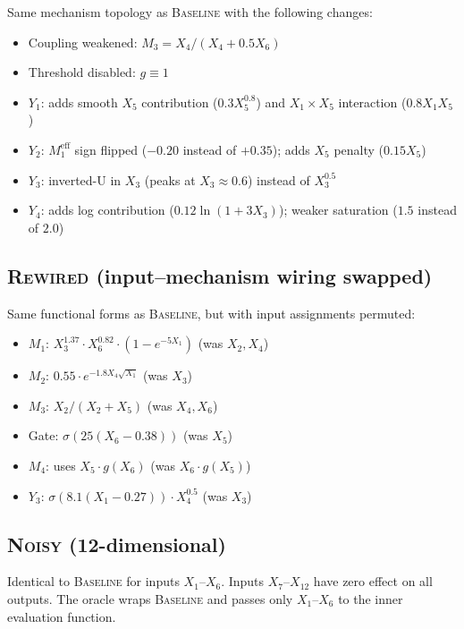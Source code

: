 \documentclass[11pt,letterpaper]{article}
\newcommand{\oracle}[1]{\textsc{#1}}
\newcommand{\baseline}{\oracle{Baseline}}
\newcommand{\rewired}{\oracle{Rewired}}
\newcommand{\noisy}{\oracle{Noisy}}
\begin{document}
Same mechanism topology as \baseline{} with the following changes:
\begin{itemize}
  \item Coupling weakened: $M_3 = X_4 / (X_4 + 0.5 X_6)$
  \item Threshold disabled: $g \equiv 1$
  \item $Y_1$: adds smooth $X_5$ contribution ($0.3 X_5^{0.8}$) and
    $X_1 \times X_5$ interaction ($0.8 X_1 X_5$)
  \item $Y_2$: $M_1^{\text{eff}}$ sign flipped ($-0.20$ instead of
    $+0.35$); adds $X_5$ penalty ($0.15 X_5$)
  \item $Y_3$: inverted-U in $X_3$ (peaks at $X_3 \approx 0.6$)
    instead of $X_3^{0.5}$
  \item $Y_4$: adds log contribution ($0.12 \ln(1 + 3X_3)$); weaker
    saturation ($1.5$ instead of $2.0$)
\end{itemize}

\subsection{\rewired{} (input--mechanism wiring swapped)}

Same functional forms as \baseline{}, but with input assignments
permuted:
\begin{itemize}
  \item $M_1$: $X_3^{1.37} \cdot X_6^{0.82} \cdot (1 - e^{-5X_1})$
    \quad (was $X_2, X_4$)
  \item $M_2$: $0.55 \cdot e^{-1.8 X_4 \sqrt{X_1}}$
    \quad (was $X_3$)
  \item $M_3$: $X_2 / (X_2 + X_5)$
    \quad (was $X_4, X_6$)
  \item Gate: $\sigma(25(X_6 - 0.38))$
    \quad (was $X_5$)
  \item $M_4$: uses $X_5 \cdot g(X_6)$
    \quad (was $X_6 \cdot g(X_5)$)
  \item $Y_3$: $\sigma(8.1(X_1 - 0.27)) \cdot X_4^{0.5}$
    \quad (was $X_3$)
\end{itemize}

\subsection{\noisy{} (12-dimensional)}

Identical to \baseline{} for inputs $X_1$--$X_6$. Inputs
$X_7$--$X_{12}$ have zero effect on all outputs. The oracle wraps
\baseline{} and passes only $X_1$--$X_6$ to the inner evaluation
function.
\end{document}
